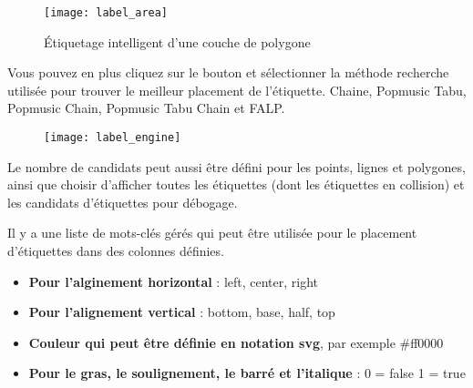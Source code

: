 \begin{figure}[ht]
\centering
   \texttt{[image: label\_area]}
   \caption{Étiquetage intelligent d'une couche de polygone \nixcaption}\label{fig:arealabel}
\end{figure}


Vous pouvez en plus cliquez sur le bouton  et 
sélectionner la méthode recherche utilisée pour trouver le meilleur placement de 
l'étiquette. Chaine, Popmusic Tabu, Popmusic Chain, Popmusic Tabu Chain et FALP.

\begin{figure}[ht]
\centering
   \texttt{[image: label\_engine]}
\end{figure}

Le nombre de candidats peut aussi être défini pour les points, lignes et 
polygones, ainsi que choisir d'afficher toutes les étiquettes (dont les étiquettes 
en collision) et les candidats d'étiquettes pour débogage.


Il y a une liste de mots-clés gérés qui peut être utilisée pour le placement 
d'étiquettes dans des colonnes définies.

\begin{itemize}[label=--]
\item \textbf{Pour l'alginement horizontal} : left, center, right
\item \textbf{Pour l'alignement vertical} : bottom, base, half, top
\item \textbf{Couleur qui peut être définie en notation svg}, par exemple \#ff0000
\item \textbf{Pour le gras, le soulignement, le barré et l'italique} : 0 = false 1 = true
\end{itemize}

